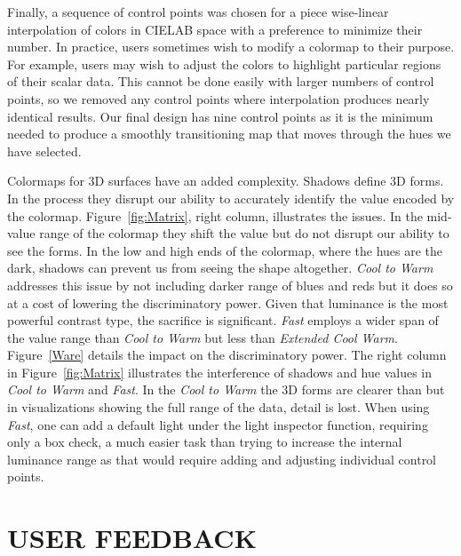 \documentclass{IEEEcsmag}
\newcommand*{\colormap}[1]{\textsl{#1}\xspace}
\newcommand*{\coolwarm}{\colormap{Cool to Warm}}
\newcommand*{\fast}{\colormap{Fast}}
\begin{document}
Finally, a sequence of control points was chosen for a piece wise-linear interpolation of colors in CIELAB space with a preference to minimize their number.
In practice, users sometimes wish to modify a colormap to their purpose.
For example, users may wish to adjust the colors to highlight particular regions of their scalar data.
This cannot be done easily with larger numbers of control points, so we removed any control points where interpolation produces nearly identical results.
Our final design has nine control points as it is the minimum needed to produce a smoothly transitioning map that moves through the hues we have selected.




 Colormaps for 3D surfaces have an added complexity. Shadows define 3D forms. In the process they disrupt our ability to accurately identify the value encoded by the colormap. Figure~\ref{fig:Matrix}, right column, illustrates the issues. In the mid-value range of the colormap they shift the value but do not disrupt our ability to see the forms. In the low and high ends of the colormap, where the hues are the dark, shadows can prevent us from seeing the shape altogether. \coolwarm addresses this issue by not including darker range of blues and reds but it does so at a cost of lowering the discriminatory power. Given that luminance is the most powerful contrast type, the sacrifice is significant. \fast employs a wider span of the value range than \coolwarm but less than \textit{Extended Cool Warm}. Figure~\ref{Ware} details the impact on the discriminatory power. The right column in Figure~\ref{fig:Matrix} illustrates the interference of shadows and hue values in \coolwarm and \fast. In the \coolwarm the 3D forms are clearer than but in visualizations showing the full range of the data, detail is lost.  When using \fast, one can add a default light under the light inspector function, requiring only a box check, a much easier task than trying to increase the internal luminance range as that would require adding and adjusting individual control points.
 
\section{USER FEEDBACK}
\end{document}
